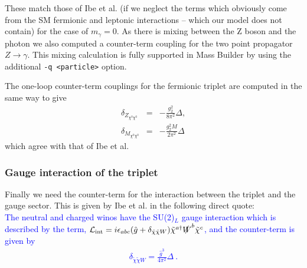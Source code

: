 \documentclass[11pt]{article}
\newcommand{\mb}{\textsf{Mass Builder} }
\begin{document}
These match those of Ibe et al. (if we neglect the terms which obviously come from the SM fermionic and leptonic interactions -- which our model does not contain) for the case of $m_{\gamma}=0$.  As there is mixing between the Z boson and the photon we also computed a counter-term coupling for the two point propagator $Z\rightarrow\gamma$.  This mixing calculation is fully supported in \mb by using the additional \lstinline{-q <particle>} option.

The one-loop counter-term couplings for the fermionic triplet are computed in the same way to give
\begin{eqnarray}
\delta_{Z_{\chi^0\chi^0}} &=&-\frac{g_2^2}{8 \pi^2}\Delta,\\
\delta_{M_{\chi^0\chi^0}} &=&-\frac{g_2^2 M}{2 \pi^2}\Delta
\end{eqnarray}
which agree with that of Ibe et al.


\subsubsection{Gauge interaction of the triplet}

Finally we need the counter-term for the interaction between the triplet and the gauge sector.  This is given by Ibe et al. \cite{Ibe2013a} in the following direct quote:\\

\textcolor{blue}{
The neutral and charged winos have the SU(2)$_L$ gauge interaction which is described by the term, ${\cal L}_{\rm int} = i\epsilon_{abc}(\hat{g} + \delta_{\tilde{\chi} \tilde{\chi} W}) \tilde{\chi}^{a \dagger} \slashed{W}^b \tilde{\chi}^c$, and the counter-term is given by
\begin{eqnarray}
\delta_{\tilde{\chi} \tilde{\chi} W} = \frac{\hat{g}^3}{4\pi^2} \Delta\ .
\end{eqnarray}
}
\end{document}
